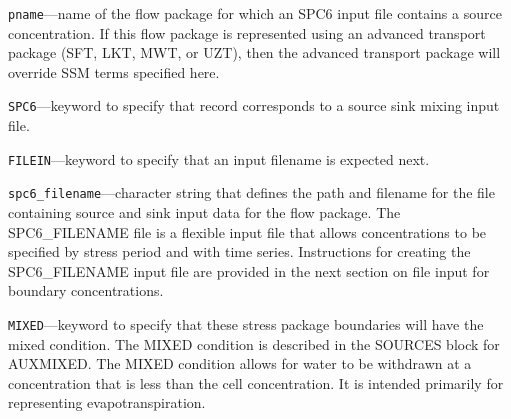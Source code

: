 \begin{description}
\item \texttt{pname}---name of the flow package for which an SPC6 input file contains a source concentration.  If this flow package is represented using an advanced transport package (SFT, LKT, MWT, or UZT), then the advanced transport package will override SSM terms specified here.

\item \texttt{SPC6}---keyword to specify that record corresponds to a source sink mixing input file.

\item \texttt{FILEIN}---keyword to specify that an input filename is expected next.

\item \texttt{spc6\_filename}---character string that defines the path and filename for the file containing source and sink input data for the flow package. The SPC6\_FILENAME file is a flexible input file that allows concentrations to be specified by stress period and with time series. Instructions for creating the SPC6\_FILENAME input file are provided in the next section on file input for boundary concentrations.

\item \texttt{MIXED}---keyword to specify that these stress package boundaries will have the mixed condition.  The MIXED condition is described in the SOURCES block for AUXMIXED.  The MIXED condition allows for water to be withdrawn at a concentration that is less than the cell concentration.  It is intended primarily for representing evapotranspiration.

\end{description}

